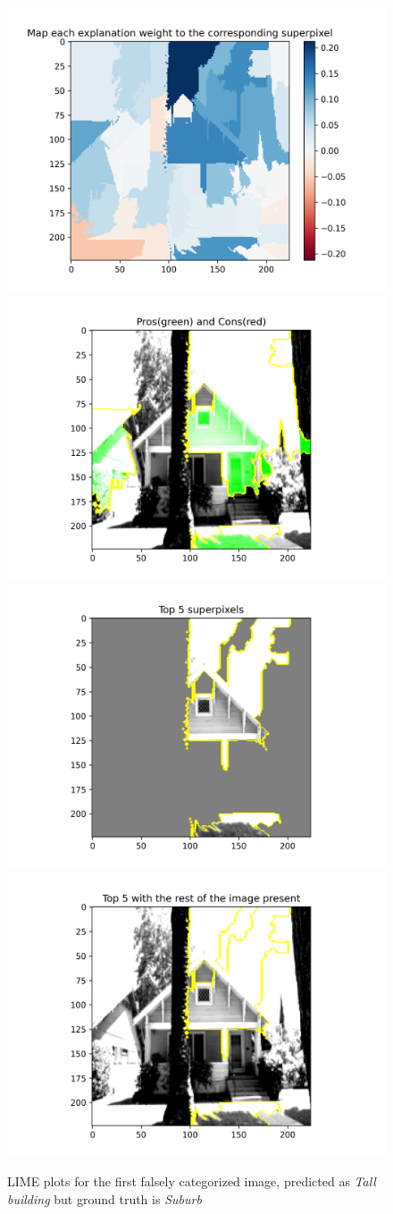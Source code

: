 \begin{figure}[htbp]
    \centering
    \includegraphics[width=0.49\linewidth]{lame_1_Map each explanation weight to the corresponding superpixel.png}
    \includegraphics[width=0.49\linewidth]{lame_1_Pros(green) and Cons(red).png}
    \includegraphics[width=0.49\linewidth]{lame_1_Top 5 superpixels.png}
    \includegraphics[width=0.49\linewidth]{lame_1_Top 5 with the rest of the image present.png}
    \caption{LIME plots for the first falsely categorized image, predicted as \emph{Tall building} but ground truth is \emph{Suburb}}
    \label{fig:LIME_1}
\end{figure}

